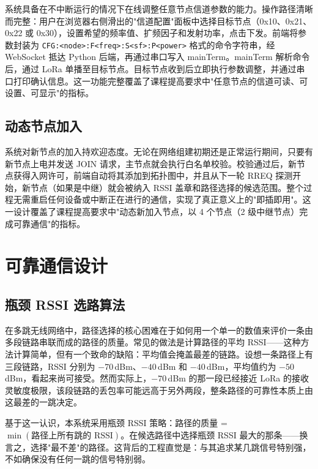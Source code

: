 \documentclass[12pt,a4paper]{ctexart}
\begin{document}
系统具备在不中断运行的情况下在线调整任意节点信道参数的能力。操作路径清晰而完整：用户在浏览器右侧滑出的"信道配置"面板中选择目标节点（0x10、0x21、0x22 或 0x30），设置希望的频率值、扩频因子和发射功率，点击下发。前端将参数封装为 \texttt{CFG:<node>:F<freq>:S<sf>:P<power>} 格式的命令字符串，经 WebSocket 抵达 Python 后端，再通过串口写入 mainTerm。mainTerm 解析命令后，通过 LoRa 单播至目标节点。目标节点收到后立即执行参数调整，并通过串口打印确认信息。这一功能完整覆盖了课程提高要求中"任意节点的信道可读、可设置、可显示"的指标。

\subsection{动态节点加入}

系统对新节点的加入持欢迎态度。无论在网络组建初期还是正常运行期间，只要有新节点上电并发送 JOIN 请求，主节点就会执行白名单校验。校验通过后，新节点获得入网许可，前端自动将其添加到拓扑图中，并且从下一轮 RREQ 探测开始，新节点（如果是中继）就会被纳入 RSSI 盖章和路径选择的候选范围。整个过程无需重启任何设备或中断正在进行的通信，实现了真正意义上的"即插即用"。这一设计覆盖了课程提高要求中"动态新加入节点，以 4 个节点（2 级中继节点）完成可靠通信"的指标。

\section{可靠通信设计}
\label{sec:reliability}

\subsection{瓶颈 RSSI 选路算法}

在多跳无线网络中，路径选择的核心困难在于如何用一个单一的数值来评价一条由多段链路串联而成的路径的质量。常见的做法是计算路径的平均 RSSI——这种方法计算简单，但有一个致命的缺陷：平均值会掩盖最差的链路。设想一条路径上有三段链路，RSSI 分别为 $-70$\,dBm、$-40$\,dBm 和 $-40$\,dBm，平均值约为 $-50$\,dBm，看起来尚可接受。然而实际上，$-70$\,dBm 的那一段已经接近 LoRa 的接收灵敏度极限，该段链路的丢包率可能远高于另外两段，整条路径的可靠性本质上由这最差的一跳决定。

基于这一认识，本系统采用瓶颈 RSSI 策略：路径的质量 = $\min(\text{路径上所有跳的 RSSI})$。在候选路径中选择瓶颈 RSSI 最大的那条——换言之，选择"最不差"的路径。这背后的工程直觉是：与其追求某几跳信号特别强，不如确保没有任何一跳的信号特别弱。
\end{document}
